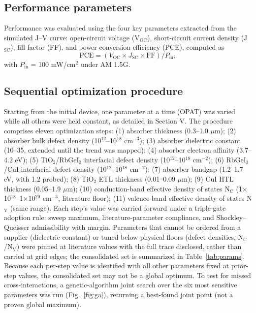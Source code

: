 \documentclass[aip,amsmath,amssymb,preprint]{revtex4-2}
\begin{document}
\subsection{Performance parameters}
Performance was evaluated using the four key parameters extracted from the simulated J--V curve: open-circuit voltage (V$_{\mathrm{OC}}$), short-circuit current density (J$_{\mathrm{SC}}$), fill factor (FF), and power conversion efficiency (PCE), computed as
\begin{equation}\label{eq:pce}
\mathrm{PCE} = (V_{\mathrm{OC}} \times J_{\mathrm{SC}} \times \mathrm{FF})/P_{\mathrm{in}},
\end{equation}
with $P_{\mathrm{in}}$ = 100 mW/cm$^{2}$ under AM 1.5G.

\subsection{Sequential optimization procedure}
Starting from the initial device, one parameter at a time (OPAT) was varied while all others were held constant, as detailed in Section V.
The procedure comprises eleven optimization steps: (1) absorber thickness (0.3--1.0 $\mu$m); (2) absorber bulk defect density (10$^{12}$--10$^{18}$ cm$^{-3}$); (3) absorber dielectric constant (10--35, extended until the trend was mapped); (4) absorber electron affinity (3.7--4.2 eV); (5) TiO$_{2}$/RbGeI$_{3}$ interfacial defect density (10$^{12}$--10$^{18}$ cm$^{-2}$); (6) RbGeI$_{3}$/CuI interfacial defect density (10$^{12}$--10$^{18}$ cm$^{-2}$); (7) absorber bandgap (1.2--1.7 eV, with 1.2 probed); (8) TiO$_{2}$ ETL thickness (0.01--0.09 $\mu$m); (9) CuI HTL thickness (0.05--1.9 $\mu$m); (10) conduction-band effective density of states N$_{\mathrm{C}}$ (1$\times$10$^{18}$--1$\times$10$^{20}$ cm$^{-3}$, literature floor); (11) valence-band effective density of states N$_{\mathrm{V}}$ (same range). Each step's value was carried forward under a triple-gate adoption rule: sweep maximum, literature-parameter compliance, and Shockley--Queisser admissibility with margin. Parameters that cannot be ordered from a supplier (dielectric constant) or tuned below physical floors (defect densities, N$_{\mathrm{C}}$/N$_{\mathrm{V}}$) were pinned at literature values with the full trace disclosed, rather than carried at grid edges; the consolidated set is summarized in Table~\ref{tab:params}.
Because each per-step value is identified with all other parameters fixed at prior-step values, the consolidated set may not be a global optimum. To test for missed cross-interactions, a genetic-algorithm joint search over the six most sensitive parameters was run (Fig.~\ref{fig:ga}), returning a best-found joint point (not a proven global maximum).
\end{document}
